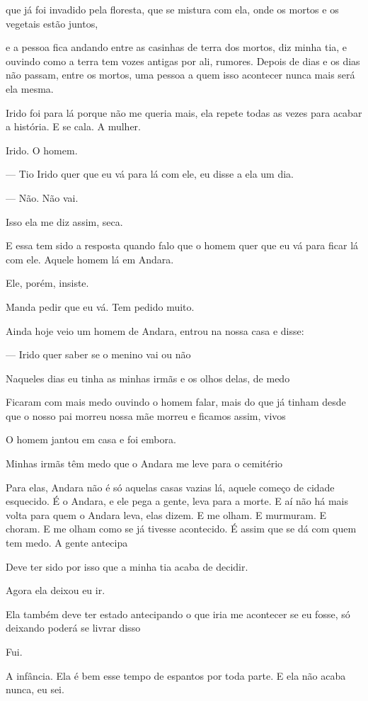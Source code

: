que já foi invadido pela floresta, que se mistura com ela, onde os
mortos e os vegetais estão juntos,

e a pessoa fica andando entre as casinhas de terra dos mortos, diz minha
tia, e ouvindo como a terra tem vozes antigas por ali, rumores. Depois
de dias e os dias não passam, entre os mortos, uma pessoa a quem isso
acontecer nunca mais será ela mesma.

Irido foi para lá porque não me queria mais, ela repete todas as vezes
para acabar a história. E se cala. A mulher.

Irido. O homem.

--- Tio Irido quer que eu vá para lá com ele, eu disse a ela um dia.

--- Não. Não vai.

Isso ela me diz assim, seca.

E essa tem sido a resposta quando falo que o homem quer que eu vá para
ficar lá com ele. Aquele homem lá em Andara.

Ele, porém, insiste.

Manda pedir que eu vá. Tem pedido muito.

Ainda hoje veio um homem de Andara, entrou na nossa casa e disse:

--- Irido quer saber se o menino vai ou não

Naqueles dias eu tinha as minhas irmãs e os olhos delas, de medo

Ficaram com mais medo ouvindo o homem falar, mais do que já tinham desde
que o nosso pai morreu nossa mãe morreu e ficamos assim, vivos

O homem jantou em casa e foi embora.

Minhas irmãs têm medo que o Andara me leve para o cemitério

Para elas, Andara não é só aquelas casas vazias lá, aquele começo de
cidade esquecido. É o Andara, e ele pega a gente, leva para a morte. E
aí não há mais volta para quem o Andara leva, elas dizem. E me olham. E
murmuram. E choram. E me olham como se já tivesse acontecido. É assim
que se dá com quem tem medo. A gente antecipa

Deve ter sido por isso que a minha tia acaba de decidir.

Agora ela deixou eu ir.

Ela também deve ter estado antecipando o que iria me acontecer se eu
fosse, só deixando poderá se livrar disso

Fui.

A infância. Ela é bem esse tempo de espantos por toda parte. E ela não
acaba nunca, eu sei.

